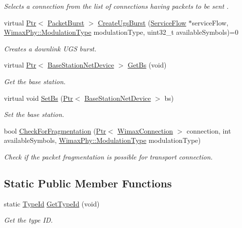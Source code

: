 \begin{DoxyCompactItemize}
\begin{DoxyCompactList}\small\item\em Selects a connection from the list of connections having packets to be sent . \end{DoxyCompactList}\item 
virtual \hyperlink{classns3_1_1Ptr}{Ptr}$<$ \hyperlink{classns3_1_1PacketBurst}{Packet\+Burst} $>$ \hyperlink{classns3_1_1BSScheduler_acc1ddc62e1c09c2800eb933462efe5b2}{Create\+Ugs\+Burst} (\hyperlink{classns3_1_1ServiceFlow}{Service\+Flow} $\ast$service\+Flow, \hyperlink{classns3_1_1WimaxPhy_a044c5d8a48ca992c39c2a946f6e755fa}{Wimax\+Phy\+::\+Modulation\+Type} modulation\+Type, uint32\+\_\+t available\+Symbols)=0
\begin{DoxyCompactList}\small\item\em Creates a downlink U\+GS burst. \end{DoxyCompactList}\item 
virtual \hyperlink{classns3_1_1Ptr}{Ptr}$<$ \hyperlink{classns3_1_1BaseStationNetDevice}{Base\+Station\+Net\+Device} $>$ \hyperlink{classns3_1_1BSScheduler_a8b09065ac8f74cb35446af55128e41c7}{Get\+Bs} (void)
\begin{DoxyCompactList}\small\item\em Get the base station. \end{DoxyCompactList}\item 
virtual void \hyperlink{classns3_1_1BSScheduler_a64cd43d547d218965cfe03892bdda4f0}{Set\+Bs} (\hyperlink{classns3_1_1Ptr}{Ptr}$<$ \hyperlink{classns3_1_1BaseStationNetDevice}{Base\+Station\+Net\+Device} $>$ bs)
\begin{DoxyCompactList}\small\item\em Set the base station. \end{DoxyCompactList}\item 
bool \hyperlink{classns3_1_1BSScheduler_aedd94450afdda0371fae56e05624bfaf}{Check\+For\+Fragmentation} (\hyperlink{classns3_1_1Ptr}{Ptr}$<$ \hyperlink{classns3_1_1WimaxConnection}{Wimax\+Connection} $>$ connection, int available\+Symbols, \hyperlink{classns3_1_1WimaxPhy_a044c5d8a48ca992c39c2a946f6e755fa}{Wimax\+Phy\+::\+Modulation\+Type} modulation\+Type)
\begin{DoxyCompactList}\small\item\em Check if the packet fragmentation is possible for transport connection. \end{DoxyCompactList}\end{DoxyCompactItemize}
\subsection*{Static Public Member Functions}
\begin{DoxyCompactItemize}
\item 
static \hyperlink{classns3_1_1TypeId}{Type\+Id} \hyperlink{classns3_1_1BSScheduler_a41e2e7d61fbb06ee9566a960bc16ca1b}{Get\+Type\+Id} (void)
\begin{DoxyCompactList}\small\item\em Get the type ID. \end{DoxyCompactList}\end{DoxyCompactItemize}
